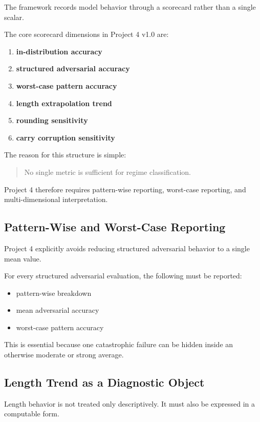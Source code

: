 \documentclass[11pt]{article}
\begin{document}
The framework records model behavior through a scorecard rather than a single scalar.

The core scorecard dimensions in Project 4 v1.0 are:
\begin{enumerate}[leftmargin=1.5em]
    \item \textbf{in-distribution accuracy}
    \item \textbf{structured adversarial accuracy}
    \item \textbf{worst-case pattern accuracy}
    \item \textbf{length extrapolation trend}
    \item \textbf{rounding sensitivity}
    \item \textbf{carry corruption sensitivity}
\end{enumerate}

The reason for this structure is simple:

\begin{quote}
No single metric is sufficient for regime classification.
\end{quote}

Project 4 therefore requires pattern-wise reporting, worst-case reporting, and multi-dimensional interpretation.

\subsection{Pattern-Wise and Worst-Case Reporting}

Project 4 explicitly avoids reducing structured adversarial behavior to a single mean value.

For every structured adversarial evaluation, the following must be reported:
\begin{itemize}[leftmargin=1.5em]
    \item pattern-wise breakdown
    \item mean adversarial accuracy
    \item worst-case pattern accuracy
\end{itemize}

This is essential because one catastrophic failure can be hidden inside an otherwise moderate or strong average.

\subsection{Length Trend as a Diagnostic Object}

Length behavior is not treated only descriptively. It must also be expressed in a computable form.
\end{document}
